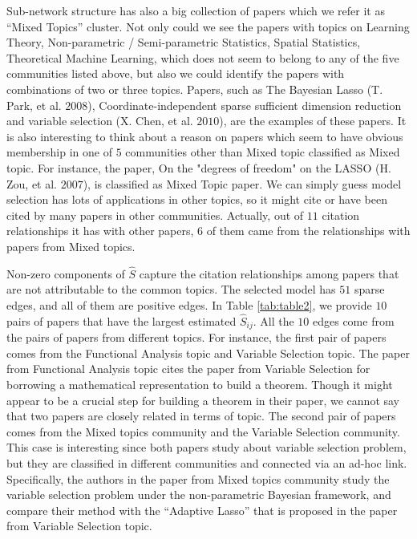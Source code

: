 \documentclass[AMS,STIX1COL]{WileyNJD-v2}
\begin{document}
{Sub-network structure has also a big collection of papers which we refer it as ``Mixed Topics'' cluster.
Not only could we see the papers with topics on Learning Theory, Non-parametric / Semi-parametric Statistics, Spatial Statistics, Theoretical Machine Learning, which does not seem to belong to any of the five communities listed above, but also we could identify the papers with combinations of two or three topics.
Papers, such as The Bayesian Lasso (T. Park, et al. $2008$), Coordinate-independent sparse sufficient dimension reduction and variable selection (X. Chen, et al. $2010$), are the examples of these papers.
It is also interesting to think about a reason on papers which seem to have obvious membership in one of $5$ communities other than Mixed topic classified as Mixed topic.
For instance, the paper, On the "degrees of freedom" on the LASSO (H. Zou, et al. $2007$), is classified as Mixed Topic paper.
We can simply guess model selection has lots of applications in other topics, so it might cite or have been cited by many papers in other communities.
Actually, out of $11$ citation relationships it has with other papers, $6$ of them came from the relationships with papers from Mixed topics.

Non-zero components of $\widehat{S}$ capture the citation relationships among papers that are not attributable to the common topics.
The selected model has $51$ sparse edges, and all of them are positive edges.
In Table \ref{tab:table2}, we provide $10$ pairs of papers that have the largest estimated $\widehat{S}_{ij}$.
All the $10$ edges come from the pairs of papers from different topics.
For instance, the first pair of papers comes from the Functional Analysis topic and Variable Selection topic.
The paper from Functional Analysis topic cites the paper from Variable Selection for borrowing a mathematical representation to build a theorem.
Though it might appear to be a crucial step for building a theorem in their paper, we cannot say that two papers are closely related in terms of topic.
The second pair of papers comes from the Mixed topics community and the Variable Selection community.
This case is interesting since both papers study about variable selection problem, but they are classified in different communities and connected via an ad-hoc link.
Specifically, the authors in the paper from Mixed topics community study the variable selection problem under the non-parametric Bayesian framework, and compare their method with the ``Adaptive Lasso'' that is proposed in the paper from Variable Selection topic.


}
\end{document}
